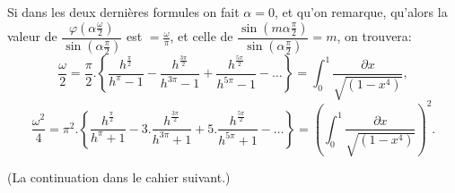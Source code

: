 \documentclass{article}
\begin{document}
Si dans les deux dernières formules on fait $\alpha=0$, et qu'on remarque, qu'alors la valeur de $\dfrac{\varphi\left(\alpha\frac{\omega}{2}\right)}{\sin\left(\alpha\frac{\pi}{2}\right)}$ est $=\frac{\omega}{\pi}$, et celle de $\dfrac{\sin\left(m\alpha\frac{\pi}{2}\right)}{\sin\left(\alpha\frac{\pi}{2}\right)}=m$, on trouvera:
\[
\frac{\omega}{2} = \frac{\pi}{2}.\left\{\frac{h^{\frac{\pi}{2}}}{h^{\pi}-1}-\frac{h^{\frac{3\pi}{2}}}{h^{3\pi}-1}+\frac{h^{\frac{5\pi}{2}}}{h^{5\pi}-1}-\ldots\right\} = \int_{0}^{1}\frac{\partial x}{\sqrt{(1-x^{4})}},
\]
\[
\frac{\omega^{2}}{4} = \pi^{2}.\left\{\frac{h^{\frac{\pi}{2}}}{h^{\pi}+1}-3.\frac{h^{\frac{3\pi}{2}}}{h^{3\pi}+1}+5.\frac{h^{\frac{5\pi}{2}}}{h^{5\pi}+1}-\ldots\right\} = \left(\int_{0}^{1}\frac{\partial x}{\sqrt{(1-x^{4})}}\right)^{2}.
\]

(La continuation dans le cahier suivant.)
\end{document}
